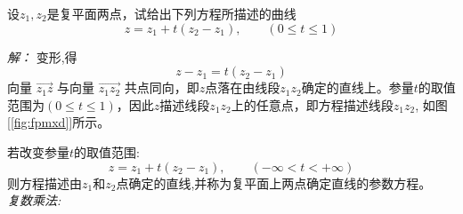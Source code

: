     \begin{example}
        设$z_1, z_2$是复平面两点，试给出下列方程所描述的曲线
        \[ z= z_1 + t (z_2 - z_1), \qquad (0\le t\le 1)\]
    \end{example}
    \emph{解：} 变形,得 
    \[ z -z_1 = t (z_2 - z_1)\]
    向量 $\overrightarrow{z_1 z}$ 与向量 $\overrightarrow{z_1 z_2}$ 共点同向，即$z$点落在由线段$z_1z_2$确定的直线上。参量$t$的取值范围为$(0\le t\le 1)$，因此$z$描述线段$z_1z_2$上的任意点，即方程描述线段$z_1z_2$, 如图[\ref{fig:fpmxd}]所示。

    若改变参量$t$的取值范围: 
    \begin{equation}
        z= z_1 + t (z_2 - z_1), \qquad (-\infty < t < +\infty)
    \end{equation}
则方程描述由$z_1$和$z_2$点确定的直线,并称为复平面上两点确定直线的参数方程。\\
    
\noindent \emph{复数乘法: } 

